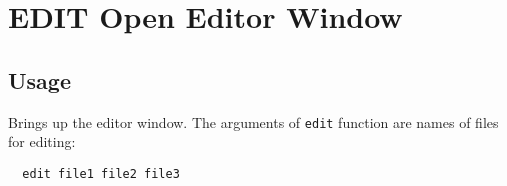 \section{EDIT Open Editor Window}

\subsection{Usage}

Brings up the editor window.  The arguments of \verb|edit| function  
are names of files for editing:
\begin{verbatim}
  edit file1 file2 file3
\end{verbatim}
